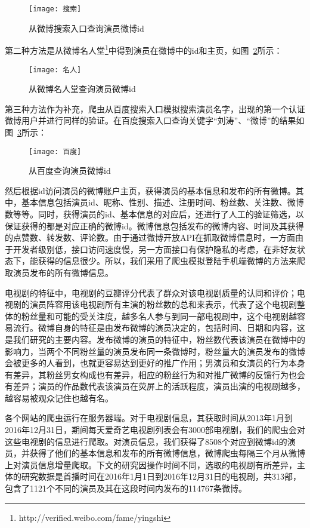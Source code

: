 \begin{figure}[!htbp]
\centering
\texttt{[image: 搜索]}
\caption{从微博搜索入口查询演员微博id}
\label{搜索}
\end{figure}

第二种方法是从微博名人堂\footnote{http://verified.weibo.com/fame/yingshi}中得到演员在微博中的id和主页，如图~\ref{名人}所示：

\begin{figure}[!htbp]
\centering
\texttt{[image: 名人]}
\caption{从微博名人堂查询演员微博id}
\label{名人}
\end{figure}

第三种方法作为补充，爬虫从百度搜索入口模拟搜索演员名字，出现的第一个认证微博用户并进行同样的验证。在百度搜索入口查询关键字“刘涛”、“微博”的结果如图~\ref{百度}所示：

\begin{figure}[!htbp]
\centering
\texttt{[image: 百度]}
\caption{从百度查询演员微博id}
\label{百度}
\end{figure}

然后根据id访问演员的微博账户主页，获得演员的基本信息和发布的所有微博。其中，基本信息包括演员id、昵称、性别、描述、注册时间、粉丝数、关注数、微博数等等。同时，获得演员的id、基本信息的对应后，还进行了人工的验证筛选，以保证获得的都是对应正确的微博id。微博信息包括发布的微博内容、时间及其获得的点赞数、转发数、评论数。由于通过微博开放API在抓取微博信息时，一方面由于开发者级别低，接口访问速度慢，另一方面接口有保护隐私的考虑，在非好友状态下，能获得的信息很少。所以，我们采用了爬虫模拟登陆手机端微博的方法来爬取演员发布的所有微博信息。

电视剧的特征中，电视剧的豆瓣评分代表了群众对该电视剧质量的认同和评价；电视剧的演员阵容用该电视剧所有主演的粉丝数的总和来表示，代表了这个电视剧整体的粉丝量和可能的受关注度，越多名人参与到同一部电视剧中，这个电视剧越容易流行。微博自身的特征是由发布微博的演员决定的，包括时间、日期和内容，这是我们研究的主要内容。发布微博的演员的特征中，粉丝数代表该演员在微博中的影响力，当两个不同粉丝量的演员发布同一条微博时，粉丝量大的演员发布的微博会被更多的人看到，也就更容易达到更好的推广作用；男演员和女演员的行为本身有差异，其粉丝男女构成也有差异，相应的粉丝行为和对推广微博的反馈行为也会有差异；演员的作品数代表该演员在荧屏上的活跃程度，演员出演的电视剧越多，越容易被观众记住也越有名。

各个网站的爬虫运行在服务器端。对于电视剧信息，其获取时间从2013年1月到2016年12月31日，期间每天爱奇艺电视剧列表会有3000部电视剧，我们的爬虫会对这些电视剧的信息进行爬取。对演员信息，我们获得了8508个对应到微博id的演员，并获得了他们的基本信息和发布的所有微博信息，微博爬虫每隔三个月从微博上对演员信息增量爬取。下文的研究因操作时间不同，选取的电视剧有所差异，主体的研究数据是首播时间在2016年1月1日到2016年12月31日的电视剧，共313部，包含了1121个不同的演员及其在这段时间内发布的114767条微博。

